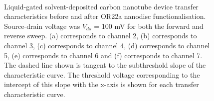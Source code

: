 \documentclass[
  a4paper,
]{scrbook}
\begin{document}
\begin{figure}
\begin{minipage}[t]{0.45\linewidth}
{{}

}

\end{minipage}%
%
\begin{minipage}[t]{0.01\linewidth}

{\centering 

~

}

\end{minipage}%

\caption[Liquid-gated solvent-deposited carbon nanotube device transfer
characteristics before and after OR22a nanodisc functionalisation, with
the threshold voltage shown for each transfer characteristic
curve.]{\label{fig-solvent-deposited-sensing-TX}Liquid-gated
solvent-deposited carbon nanotube device transfer characteristics before
and after OR22a nanodisc functionalisation. Source-drain voltage was
\(V_{ds}\) = 100 mV for both the forward and reverse sweep. (a)
corresponds to channel 2, (b) corresponds to channel 3, (c) corresponds
to channel 4, (d) corresponds to channel 5, (e) corresponds to channel 6
and (f) corresponds to channel 7. The dashed line shown is tangent to
the subthreshold slope of the characteristic curve. The threshold
voltage corresponding to the intercept of this slope with the x-axis is
shown for each transfer characteristic curve.}

\end{figure}
\end{document}
